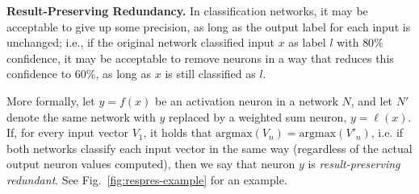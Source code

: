 \documentclass[10pt, conference, twocolumn, compsocconf]{IEEEtran}
\theoremstyle{remark}
\newcommand{\argmax}{\text{argmax}\xspace}
\begin{document}
\medskip
\noindent
\textbf{Result-Preserving Redundancy.}  In classification networks, it
may be acceptable to give up some precision, as long as the output
label for each input is unchanged; i.e., if the original network
classified input $x$ as label $l$ with $80\%$ confidence, it may be
acceptable to remove neurons in a way that reduces this confidence to
$60\%$, as long as $x$ is still classified as $l$.

More formally, let $y=f(x)$ be an activation neuron in a network $N$,
and let $N'$ denote the same network with $y$ replaced by a weighted
sum neuron, $y=\ell(x)$. If, for every input vector $V_1$, it holds
that $\argmax(V_n)=\argmax(V'_n)$, i.e. if both networks classify each
input vector in the same way (regardless of the actual output neuron
values computed), then we say that neuron $y$ is
\emph{result-preserving redundant}. See Fig.~\ref{fig:respres-example}
for an example.
\end{document}
